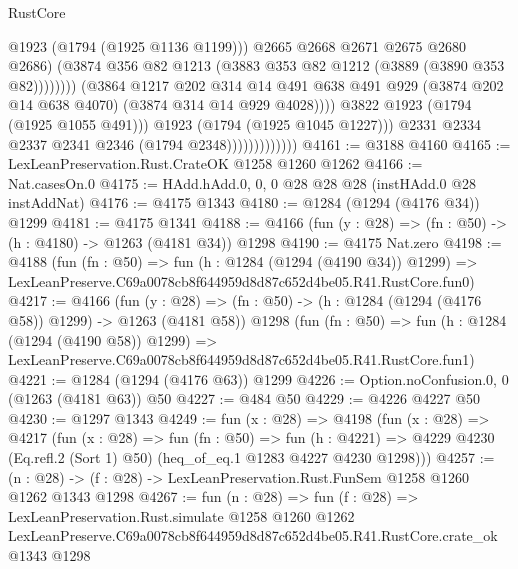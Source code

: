 \begin{lexlean}{RustCore}
\begin{coremodule}
                                                @1923
                                                (@1794 (@1925 @1136 @1199)))
                                              @2665
                                              @2668
                                              @2671
                                              @2675
                                              @2680
                                              @2686)
                                            (@3874
                                              @356
                                              @82
                                              @1213
                                              (@3883 @353 @82 @1212 (@3889 (@3890 @353 @82))))))))
                                    (@3864
                                      @1217
                                      @202
                                      @314
                                      @14
                                      @491
                                      @638
                                      @491
                                      @929
                                      (@3874 @202 @14 @638 @4070)
                                      (@3874 @314 @14 @929 @4028))))
                                @3822
                                @1923
                                (@1794 (@1925 @1055 @491)))
                              @1923
                              (@1794 (@1925 @1045 @1227)))
                            @2331
                            @2334
                            @2337
                            @2341
                            @2346
                            (@1794 @2348)))))))))))))
@4161 := @3188 @4160
@4165 := LexLeanPreservation.Rust.CrateOK @1258 @1260 @1262
@4166 := Nat.casesOn.{0}
@4175 := HAdd.hAdd.{0, 0, 0} @28 @28 @28 (instHAdd.{0} @28 instAddNat)
@4176 := @4175 @1343
@4180 := @1284 (@1294 (@4176 @34)) @1299
@4181 := @4175 @1341
@4188 := @4166 (fun (y : @28) => (fn : @50) -> (h : @4180) -> @1263 (@4181 @34)) @1298
@4190 := @4175 Nat.zero
@4198 := @4188
    (fun (fn : @50) =>
    fun (h : @1284 (@1294 (@4190 @34)) @1299) =>
    LexLeanPreserve.C69a0078cb8f644959d8d87c652d4be05.R41.RustCore.fun0)
@4217 := @4166
    (fun (y : @28) => (fn : @50) -> (h : @1284 (@1294 (@4176 @58)) @1299) -> @1263 (@4181 @58))
    @1298
    (fun (fn : @50) =>
    fun (h : @1284 (@1294 (@4190 @58)) @1299) =>
    LexLeanPreserve.C69a0078cb8f644959d8d87c652d4be05.R41.RustCore.fun1)
@4221 := @1284 (@1294 (@4176 @63)) @1299
@4226 := Option.noConfusion.{0, 0} (@1263 (@4181 @63)) @50
@4227 := @484 @50
@4229 := @4226 @4227 @50
@4230 := @1297 @1343
@4249 := fun (x : @28) =>
  @4198
    (fun (x : @28) =>
    @4217
      (fun (x : @28) =>
      fun (fn : @50) =>
      fun (h : @4221) =>
      @4229 @4230 (Eq.refl.{2} (Sort 1) @50) (heq_of_eq.{1} @1283 @4227 @4230 @1298)))
@4257 := (n : @28) -> (f : @28) -> LexLeanPreservation.Rust.FunSem @1258 @1260 @1262 @1343 @1298
@4267 := fun (n : @28) =>
  fun (f : @28) =>
  LexLeanPreservation.Rust.simulate
    @1258
    @1260
    @1262
    LexLeanPreserve.C69a0078cb8f644959d8d87c652d4be05.R41.RustCore.crate_ok
    @1343
    @1298
\end{coremodule}
\end{lexlean}

